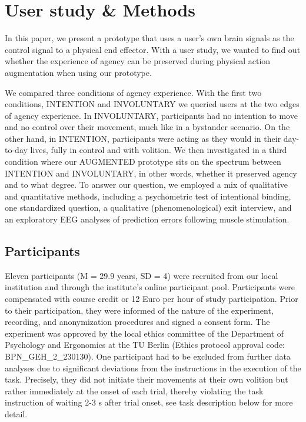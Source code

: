 
\section{User study \& Methods}
In this paper, we present a prototype that uses a user's own brain signals as the control signal to a physical end effector. With a user study, we wanted to find out whether the experience of agency can be preserved during physical action augmentation when using our prototype. 

We compared three conditions of agency experience. With the first two conditions, INTENTION and INVOLUNTARY we queried users at the two edges of agency experience. In INVOLUNTARY, participants had no intention to move and no control over their movement, much like in a bystander scenario. On the other hand, in INTENTION, participants were acting as they would in their day-to-day lives, fully in control and with volition. We then investigated in a third condition where our AUGMENTED prototype sits on the spectrum between INTENTION and INVOLUNTARY, in other words, whether it preserved agency and to what degree. To answer our question, we employed a mix of qualitative and quantitative methods, including a psychometric test of intentional binding, one standardized question, a qualitative (phenomenological) exit interview, and an exploratory EEG analyses of prediction errors following muscle stimulation.


\subsection{Participants}
Eleven participants (M = 29.9 years, SD = 4) were recruited from our local institution and through the institute's online participant pool. Participants were compensated with course credit or 12 Euro per hour of study participation. Prior to their participation, they were informed of the nature of the experiment, recording, and anonymization procedures and signed a consent form. The experiment was approved by the local ethics committee of the Department of Psychology and Ergonomics at the TU Berlin (Ethics protocol approval code: BPN\_GEH\_2\_230130). One participant had to be excluded from further data analyses due to significant deviations from the instructions in the execution of the task. Precisely, they did not initiate their movements at their own volition but rather immediately at the onset of each trial, thereby violating the task instruction of waiting 2-3 s after trial onset, see task description below for more detail.


